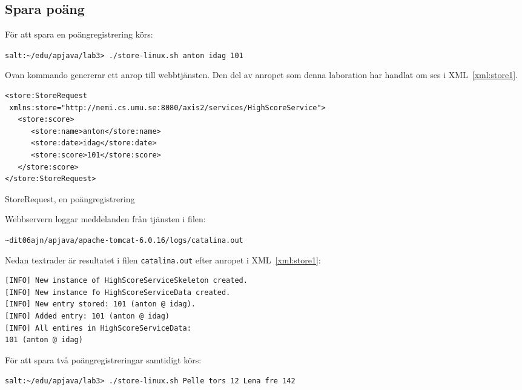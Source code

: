 \documentclass[a4paper, 12pt]{article}
\begin{document}
\subsection{Spara poäng}\label{sec:spara}

För att spara en poängregistrering körs:

\begin{footnotesize}
\verb!salt:~/edu/apjava/lab3> ./store-linux.sh anton idag 101!
\end{footnotesize}

Ovan kommando genererar ett anrop till webbtjänsten. Den del av
anropet som denna laboration har handlat om ses i
XML~\ref{xml:store1}.

\begin{xml}
  \begin{footnotesize}
\begin{verbatim}
<store:StoreRequest
 xmlns:store="http://nemi.cs.umu.se:8080/axis2/services/HighScoreService">
   <store:score>
      <store:name>anton</store:name>
      <store:date>idag</store:date>
      <store:score>101</store:score>
   </store:score>
</store:StoreRequest>
\end{verbatim}
  \end{footnotesize}
  \caption{StoreRequest, en poängregistrering}\label{xml:store1}
\end{xml}

Webbservern loggar meddelanden från tjänsten i filen:

\begin{footnotesize}
\verb!~dit06ajn/apjava/apache-tomcat-6.0.16/logs/catalina.out!
\end{footnotesize}

Nedan textrader är resultatet i filen \verb!catalina.out! efter
anropet i XML~\ref{xml:store1}:

\begin{footnotesize}
\begin{verbatim}
[INFO] New instance of HighScoreServiceSkeleton created.
[INFO] New instance fo HighScoreServiceData created.
[INFO] New entry stored: 101 (anton @ idag).
[INFO] Added entry: 101 (anton @ idag)
[INFO] All entires in HighScoreServiceData:
101 (anton @ idag)
\end{verbatim}
\end{footnotesize}

För att spara två poäng\-registreringar samtidigt körs: 

\begin{footnotesize}
\verb!salt:~/edu/apjava/lab3> ./store-linux.sh Pelle tors 12 Lena fre 142!
\end{footnotesize}
\end{document}
